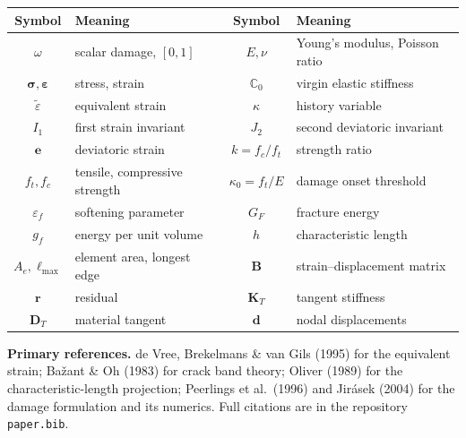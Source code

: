 \documentclass[11pt]{article}
\newcommand{\eps}{\bm{\varepsilon}}
\newcommand{\sig}{\bm{\sigma}}
\newcommand{\C}{\mathbb{C}}
\newcommand{\eqs}{\tilde{\varepsilon}}
\begin{document}
\begin{center}
\renewcommand{\arraystretch}{1.25}
\begin{tabular}{@{}cl@{\hskip 2em}cl@{}}
\toprule
Symbol & Meaning & Symbol & Meaning \\
\midrule
$\omega$        & scalar damage, $[0,1]$       & $E,\nu$         & Young's modulus, Poisson ratio \\
$\sig,\eps$     & stress, strain               & $\C_0$          & virgin elastic stiffness \\
$\eqs$          & equivalent strain            & $\kappa$        & history variable \\
$I_1$           & first strain invariant       & $J_2$           & second deviatoric invariant \\
$\bm e$         & deviatoric strain            & $k=f_c/f_t$     & strength ratio \\
$f_t,f_c$       & tensile, compressive strength& $\kappa_0=f_t/E$& damage onset threshold \\
$\varepsilon_f$ & softening parameter          & $G_F$           & fracture energy \\
$g_f$           & energy per unit volume       & $h$             & characteristic length \\
$A_e,\ell_{\max}$& element area, longest edge  & $\bm B$         & strain--displacement matrix \\
$\bm r$         & residual                     & $\bm K_T$       & tangent stiffness \\
$\bm D_T$       & material tangent             & $\bm d$         & nodal displacements \\
\bottomrule
\end{tabular}
\end{center}

\bigskip
\noindent\textbf{Primary references.} de Vree, Brekelmans \& van Gils (1995) for the
equivalent strain; Ba\v{z}ant \& Oh (1983) for crack band theory; Oliver (1989) for the
characteristic-length projection; Peerlings et al.\ (1996) and Jir\'asek (2004) for the
damage formulation and its numerics. Full citations are in the repository
\texttt{paper.bib}.
\end{document}
